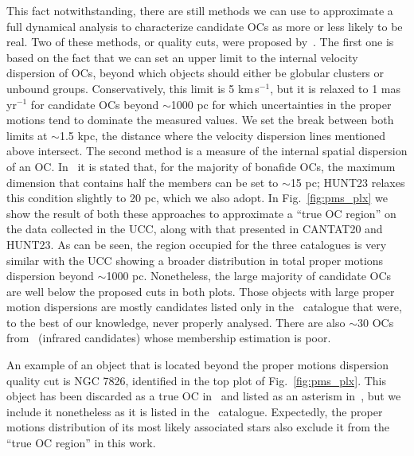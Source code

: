 \documentclass[fleqn,usenatbib]{mnras}
\begin{document}
This fact notwithstanding, there are still methods we can use to approximate
a full dynamical analysis to characterize candidate OCs as more or less likely
to be real. Two of these methods, or quality cuts, were proposed
by~\cite{Cantat-Anders_2020}.
The first one is based on the fact that we can set an upper limit to the
internal velocity dispersion of OCs, beyond which objects should either be
globular clusters or unbound groups. Conservatively, this limit is 5
km\,s$^{-1}$, but it is relaxed to 1 mas\,yr$^{-1}$ for candidate OCs
beyond $\sim$1000 pc for which uncertainties in the proper motions tend to
dominate the measured values.
We set the break between both limits at $\sim$1.5 kpc, the distance
where the velocity dispersion lines mentioned above intersect.
%
The second method is a measure of the internal spatial dispersion of an OC.
In~\cite{Cantat-Anders_2020} it is stated that, for the majority of
bonafide OCs, the maximum dimension that contains half the members can be set to
$\sim$15 pc; HUNT23 relaxes this condition slightly to 20 pc, which we also
adopt.
In Fig.~\ref{fig:pms_plx} we show the result of both these approaches to
approximate a ``true OC region'' on the data collected in the UCC, along with
that presented in CANTAT20 and HUNT23.
As can be seen, the region occupied for the three catalogues is very similar
with the UCC showing a broader distribution in total proper motions dispersion
beyond $\sim$1000 pc.
Nonetheless, the large majority of candidate OCs are well below the proposed
cuts in both plots. Those objects with large proper motion dispersions are
mostly candidates listed only in the~\cite{Kharchenko_2012} catalogue that were,
to the best of our knowledge, never properly analysed. There are also $\sim$30
OCs from~\cite{Ryu_2018} (infrared candidates) whose membership estimation
is poor.

An example of an object that is located beyond the proper motions dispersion
quality cut is NGC 7826, identified in the top plot of Fig.~\ref{fig:pms_plx}.
This object has been discarded as a true OC in~\cite{Kos_2018} and listed as an
asterism in~\cite{Cantat-Anders_2020}, but we include it nonetheless as it is
listed in the~\cite{Loktin_2017} catalogue. Expectedly, the proper motions
distribution of its most likely associated stars also exclude it from the
``true OC region'' in this work.\\
\end{document}
